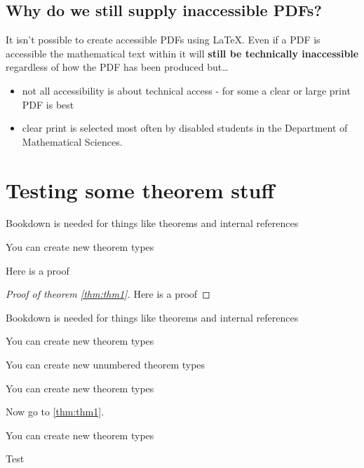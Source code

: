 \documentclass[10pt,english,a4paper]{article}
\providecommand{\tightlist}{%
  \setlength{\itemsep}{0pt}\setlength{\parskip}{0pt}}
\theoremstyle{plain}
\theoremstyle{plain}
\theoremstyle{plain}
\theoremstyle{plain}
\theoremstyle{plain}
\theoremstyle{definition}
\theoremstyle{definition}
\theoremstyle{definition}
\theoremstyle{remark}
\theoremstyle{remark}
\let\BeginKnitrBlock\begin \let\EndKnitrBlock\end
\begin{document}
\hypertarget{why-do-we-still-supply-inaccessible-pdfs}{%
\subsection{Why do we still supply inaccessible PDFs?}\label{why-do-we-still-supply-inaccessible-pdfs}}

It isn't possible to create accessible PDFs using LaTeX. Even if a PDF is accessible the mathematical text within it will \textbf{still be technically inaccessible} regardless of how the PDF has been produced but\ldots{}

\begin{itemize}
\tightlist
\item
  not all accessibility is about technical access - for some a clear or large print PDF is best
\item
  clear print is selected most often by disabled students in the Department of Mathematical Sciences.
\end{itemize}

\hypertarget{testing-some-theorem-stuff}{%
\section{Testing some theorem stuff}\label{testing-some-theorem-stuff}}

\BeginKnitrBlock{theorem}[Foo]
\label{thm:thm1} \iffalse (Foo) \fi{} Bookdown is needed for things like theorems and internal references
\EndKnitrBlock{theorem}

\BeginKnitrBlock{proposition}[Thingy we need for \ref{thm:thm1}]
\label{prp:prp1} \iffalse (Thingy we need for \ref{thm:thm1}) \fi{} You can create new theorem types
\EndKnitrBlock{proposition}

\BeginKnitrBlock{Proof}[Of theorem \ref{thm:thm1}]
\protect\hypertarget{Proof:unnamed-chunk-1}{}{\iffalse{} (\) \fi{}}Here is a proof
\EndKnitrBlock{Proof}

\BeginKnitrBlock{proof}[Proof of theorem \ref{thm:thm1}]
\iffalse{} {Proof (Proof of theorem \ref{thm:thm1}). } \fi{}Here is a proof
\EndKnitrBlock{proof}

\BeginKnitrBlock{proposition}
\label{prp:prp2} Bookdown is needed for things like theorems and internal references
\EndKnitrBlock{proposition}

\BeginKnitrBlock{Thought}[Bar]
\protect\hypertarget{Thought:tho1}{}{\iffalse{} \label{tho:tho1} \fi{}}You can create new theorem types
\EndKnitrBlock{Thought}

\BeginKnitrBlock{Wonder}
\protect\hypertarget{Wonder:unnamed-chunk-3}{}{\iffalse{} (\) \fi{}}You can create new unumbered theorem types
\EndKnitrBlock{Wonder}

\BeginKnitrBlock{Nugget}
\protect\hypertarget{Nugget:nug1}{}{\iffalse{} \label{nug:nug1} \fi{}}You can create new theorem types
\EndKnitrBlock{Nugget}

Now go to \ref{thm:thm1}.

\BeginKnitrBlock{Solution}
\protect\hypertarget{Solution:sol1}{}{\iffalse{} \label{sol:sol1} \fi{}}You can create new theorem types
\EndKnitrBlock{Solution}

\BeginKnitrBlock{solution}
\iffalse{} {Solution. } \fi{}Test
\EndKnitrBlock{solution}
\end{document}
